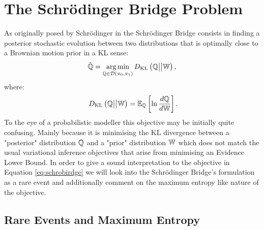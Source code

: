 \documentclass[a4paper,12pt,twoside,openright]{report}
\theoremstyle{definition}
\begin{document}
\chapter{The Schrödinger Bridge Problem}

As originally posed by Schrödinger in \citep{schrodinger1931uber, schrodinger1932theorie} the Schrödinger Bridge consists in finding a posterior stochastic evolution between two distributions that is optimally close to a Brownian motion prior in a KL sense:
\begin{align} \label{eq:schrobirdge}
    \hat{{\mathbb{Q}}}= \operatorname*{arg\,min}_{{\mathbb{Q}} \in {\mathcal{D}}(\pi_0, \pi_1)} D_{\mathrm{KL}}\left({\mathbb{Q}} \big|\big| \mathbb{W}\right),
\end{align}
where:
\begin{align} \label{eq:kl_sho}
    \ D_{\mathrm{KL}}\left({\mathbb{Q}} \big|\big| \mathbb{W}\right) = \mathbb{E}_{{\mathbb{Q}}}\left[\ln \frac{d{\mathbb{Q}}}{d\mathbb{W}}\right].
\end{align}
To the eye of a probabilistic modeller this objective may be initially quite confusing.  Mainly because it is minimising the KL divergence between a "posterior" distribution ${\mathbb{Q}}$ and a "prior" distribution $\mathbb{W}$ which does not match the usual variational inference objectives that arise from minimising an Evidence Lower Bound. In order to give a sound interpretation to the objective in Equation \ref{eq:schrobirdge} we will look into the Schrödinger Bridge's formulation as a rare event and additionally comment on the maximum entropy like nature of the objective.

\section{Rare Events and Maximum Entropy }
\end{document}
